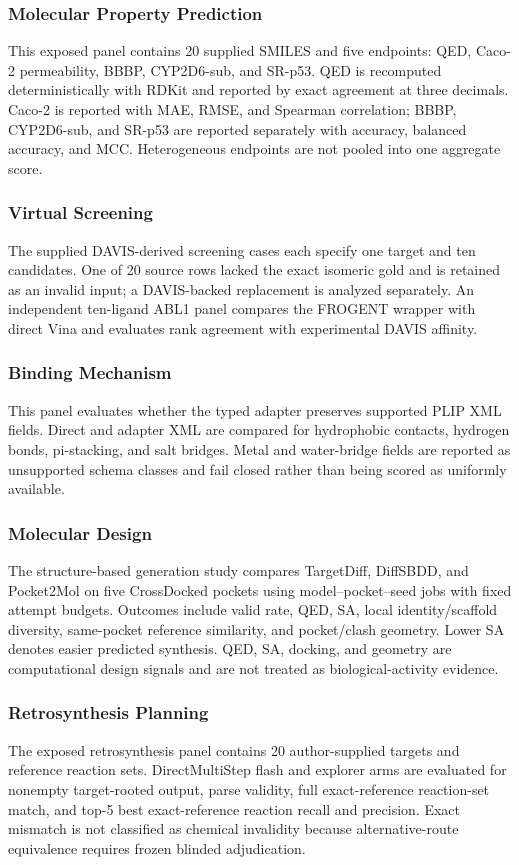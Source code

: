 \documentclass{article}
\begin{document}
\subsubsection*{Molecular Property Prediction}
This exposed panel contains 20 supplied SMILES and five endpoints: QED, Caco-2 permeability, BBBP, CYP2D6-sub, and SR-p53. QED is recomputed deterministically with RDKit and reported by exact agreement at three decimals. Caco-2 is reported with MAE, RMSE, and Spearman correlation; BBBP, CYP2D6-sub, and SR-p53 are reported separately with accuracy, balanced accuracy, and MCC. Heterogeneous endpoints are not pooled into one aggregate score.

\subsubsection*{Virtual Screening}
The supplied DAVIS-derived screening cases each specify one target and ten candidates. One of 20 source rows lacked the exact isomeric gold and is retained as an invalid input; a DAVIS-backed replacement is analyzed separately. An independent ten-ligand ABL1 panel compares the FROGENT wrapper with direct Vina and evaluates rank agreement with experimental DAVIS affinity.

\subsubsection*{Binding Mechanism}
This panel evaluates whether the typed adapter preserves supported PLIP XML fields. Direct and adapter XML are compared for hydrophobic contacts, hydrogen bonds, pi-stacking, and salt bridges. Metal and water-bridge fields are reported as unsupported schema classes and fail closed rather than being scored as uniformly available.

\subsubsection*{Molecular Design}
The structure-based generation study compares TargetDiff, DiffSBDD, and Pocket2Mol on five CrossDocked pockets using model--pocket--seed jobs with fixed attempt budgets. Outcomes include valid rate, QED, SA, local identity/scaffold diversity, same-pocket reference similarity, and pocket/clash geometry. Lower SA denotes easier predicted synthesis. QED, SA, docking, and geometry are computational design signals and are not treated as biological-activity evidence.

\subsubsection*{Retrosynthesis Planning}
The exposed retrosynthesis panel contains 20 author-supplied targets and reference reaction sets. DirectMultiStep flash and explorer arms are evaluated for nonempty target-rooted output, parse validity, full exact-reference reaction-set match, and top-5 best exact-reference reaction recall and precision. Exact mismatch is not classified as chemical invalidity because alternative-route equivalence requires frozen blinded adjudication.
\end{document}
